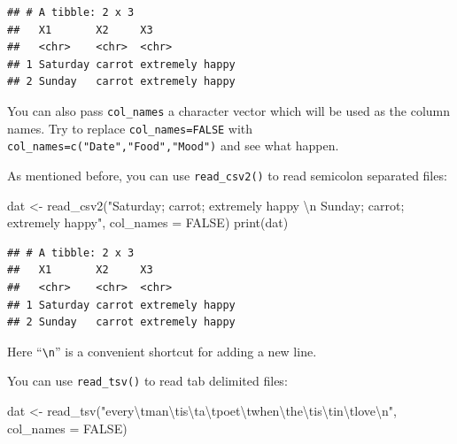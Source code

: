 \documentclass[
  12pt,
]{krantz}
\makeatletter
\newenvironment{Shaded}{\begin{snugshade}}{\end{snugshade}}
\newcommand{\AttributeTok}[1]{\textcolor[rgb]{0.61,0.61,0.61}{#1}}
\newcommand{\ConstantTok}[1]{\textcolor[rgb]{0,0,0}{#1}}
\newcommand{\FunctionTok}[1]{\textcolor[rgb]{0,0,0}{#1}}
\newcommand{\NormalTok}[1]{#1}
\newcommand{\OtherTok}[1]{\textcolor[rgb]{0.37,0.37,0.37}{#1}}
\newcommand{\SpecialCharTok}[1]{\textcolor[rgb]{0,0,0}{#1}}
\newcommand{\StringTok}[1]{\textcolor[rgb]{0.5,0.5,0.5}{#1}}
\newenvironment{kframe}{%
\medskip{}
\setlength{\fboxsep}{.8em}
 \def\at@end@of@kframe{}%
 \ifinner\ifhmode%
  \def\at@end@of@kframe{\end{minipage}}%
  \begin{minipage}{\columnwidth}%
 \fi\fi%
 \def\FrameCommand##1{\hskip\@totalleftmargin \hskip-\fboxsep
 \colorbox{shadecolor}{##1}\hskip-\fboxsep
     \hskip-\linewidth \hskip-\@totalleftmargin \hskip\columnwidth}%
 \MakeFramed {\advance\hsize-\width
   \@totalleftmargin\z@ \linewidth\hsize
   \@setminipage}}%
 {\par\unskip\endMakeFramed%
 \at@end@of@kframe}
\renewenvironment{Shaded}{\begin{kframe}}{\end{kframe}}
\makeatother
\begin{document}
\begin{verbatim}
## # A tibble: 2 x 3
##   X1       X2     X3             
##   <chr>    <chr>  <chr>          
## 1 Saturday carrot extremely happy
## 2 Sunday   carrot extremely happy
\end{verbatim}

You can also pass \texttt{col\_names} a character vector which will be used as the column names. Try to replace \texttt{col\_names=FALSE} with \texttt{col\_names=c("Date","Food","Mood")} and see what happen.

As mentioned before, you can use \texttt{read\_csv2()} to read semicolon separated files:

\begin{Shaded}
\begin{Highlighting}[]
\NormalTok{dat }\OtherTok{\textless{}{-}} \FunctionTok{read\_csv2}\NormalTok{(}\StringTok{"Saturday; carrot; extremely happy }\SpecialCharTok{\textbackslash{}n}\StringTok{ }
\StringTok{                 Sunday; carrot; extremely happy"}\NormalTok{, }\AttributeTok{col\_names =} \ConstantTok{FALSE}\NormalTok{)}
\FunctionTok{print}\NormalTok{(dat)}
\end{Highlighting}
\end{Shaded}

\begin{verbatim}
## # A tibble: 2 x 3
##   X1       X2     X3             
##   <chr>    <chr>  <chr>          
## 1 Saturday carrot extremely happy
## 2 Sunday   carrot extremely happy
\end{verbatim}

Here ``\texttt{\textbackslash{}n}'' is a convenient shortcut for adding a new line.

You can use \texttt{read\_tsv()} to read tab delimited files:

\begin{Shaded}
\begin{Highlighting}[]
\NormalTok{dat }\OtherTok{\textless{}{-}} \FunctionTok{read\_tsv}\NormalTok{(}\StringTok{"every}\SpecialCharTok{\textbackslash{}t}\StringTok{man}\SpecialCharTok{\textbackslash{}t}\StringTok{is}\SpecialCharTok{\textbackslash{}t}\StringTok{a}\SpecialCharTok{\textbackslash{}t}\StringTok{poet}\SpecialCharTok{\textbackslash{}t}\StringTok{when}\SpecialCharTok{\textbackslash{}t}\StringTok{he}\SpecialCharTok{\textbackslash{}t}\StringTok{is}\SpecialCharTok{\textbackslash{}t}\StringTok{in}\SpecialCharTok{\textbackslash{}t}\StringTok{love}\SpecialCharTok{\textbackslash{}n}\StringTok{"}\NormalTok{, }
    \AttributeTok{col\_names =} \ConstantTok{FALSE}\NormalTok{)}
\end{Highlighting}
\end{Shaded}
\end{document}
